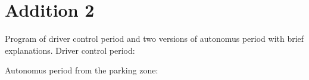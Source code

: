 \section{Addition 2}
Program of driver control period and two versions of autonomus period with brief explanations. \newline
Driver control period:

\begin{figure}[H]
	\begin{minipage}[h]{1\linewidth}
	\end{minipage}
\end{figure}
\fillpage

\begin{figure}[H]
	\begin{minipage}[h]{0.98\linewidth}
	\end{minipage}
\end{figure}

\begin{figure}[H]
	\begin{minipage}[h]{1\linewidth}
	\end{minipage}
\end{figure}

\begin{figure}[H]
	\begin{minipage}[h]{1\linewidth}
	\end{minipage}
\end{figure}

Autonomus period from the parking zone:

\begin{figure}[H]
	\begin{minipage}[h]{1\linewidth}
	\end{minipage}
\end{figure}
\fillpage

\begin{figure}[H]
	\begin{minipage}[h]{0.98\linewidth}
	\end{minipage}
\end{figure}
\fillpage

